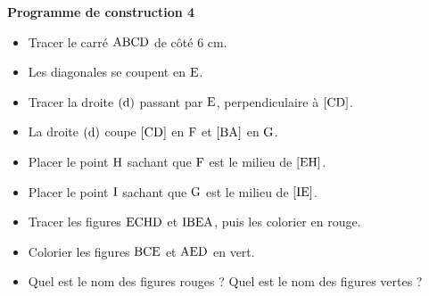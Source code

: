 \documentclass[exercice,a4]{thedocument}%
\begin{document}
%
\noindent\textbf{Programme de construction 4}\par\smallskip\noindent
\begin{itemize}
    \item Tracer le carré $\text{ABCD}$ de côté $6\text{ cm}$.
    \item Les diagonales se coupent en $\text{E}$.
    \item Tracer la droite $(\text{d})$ passant par $\text{E}$,
    perpendiculaire à $[\text{CD}]$.
    \item La droite $(\text{d})$ coupe $[\text{CD}]$ en
    $\text{F}$ et $[\text{BA}]$ en $\text{G}$.
    \item Placer le point $\text{H}$ sachant que $\text{F}$ est
    le milieu de $[\text{EH}]$.
    \item Placer le point $\text{I}$ sachant que $\text{G}$ est
    le milieu de $[\text{IE}]$.
    \item Tracer les figures $\text{ECHD}$ et $\text{IBEA}$,
    puis les colorier en rouge.
    \item Colorier les figures $\text{BCE}$ et $\text{AED}$ en
    vert.
    \item Quel est le nom des figures rouges ? Quel est le nom des figures
    vertes ?
\end{itemize}
\end{document}
